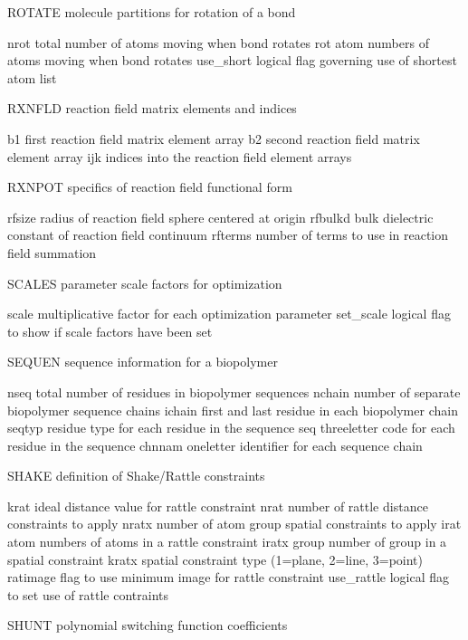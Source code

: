 \documentclass[letterpaper,11pt,english]{sphinxmanual}
\begin{document}
ROTATE  molecule partitions for rotation of a bond

nrot    total number of atoms moving when bond rotates
rot     atom numbers of atoms moving when bond rotates
use\_short       logical flag governing use of shortest atom list

RXNFLD  reaction field matrix elements and indices

b1      first reaction field matrix element array
b2      second reaction field matrix element array
ijk     indices into the reaction field element arrays

RXNPOT  specifics of reaction field functional form

rfsize  radius of reaction field sphere centered at origin
rfbulkd bulk dielectric constant of reaction field continuum
rfterms number of terms to use in reaction field summation

SCALES  parameter scale factors for optimization

scale   multiplicative factor for each optimization parameter
set\_scale       logical flag to show if scale factors have been set

SEQUEN  sequence information for a biopolymer

nseq    total number of residues in biopolymer sequences
nchain  number of separate biopolymer sequence chains
ichain  first and last residue in each biopolymer chain
seqtyp  residue type for each residue in the sequence
seq     three\sphinxhyphen{}letter code for each residue in the sequence
chnnam  one\sphinxhyphen{}letter identifier for each sequence chain

SHAKE   definition of Shake/Rattle constraints

krat    ideal distance value for rattle constraint
nrat    number of rattle distance constraints to apply
nratx   number of atom group spatial constraints to apply
irat    atom numbers of atoms in a rattle constraint
iratx   group number of group in a spatial constraint
kratx   spatial constraint type (1=plane, 2=line, 3=point)
ratimage        flag to use minimum image for rattle constraint
use\_rattle      logical flag to set use of rattle contraints

SHUNT   polynomial switching function coefficients
\end{document}

